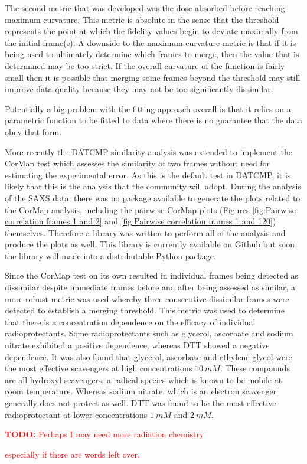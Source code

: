 The second metric that was developed was the dose absorbed before reaching maximum curvature.
This metric is absolute in the sense that the threshold represents the point at which the fidelity values begin to deviate maximally from the initial frame(s).
A downside to the maximum curvature metric is that if it is being used to ultimately determine which frames to merge, then the value that is determined may be too strict.
If the overall curvature of the function is fairly small then it is possible that merging some frames beyond the threshold may still improve data quality because they may not be too significantly dissimilar.

Potentially a big problem with the fitting approach overall is that it relies on a parametric function to be fitted to data where there is no guarantee that the data obey that form.

More recently the DATCMP similarity analysis was extended to implement the CorMap test which assesses the similarity of two frames without need for estimating the experimental error.
As this is the default test in DATCMP, it is likely that this is the analysis that the community will adopt.
During the analysis of the SAXS data, there was no package available to generate the plots related to the CorMap analysis, including the pairwise CorMap plots (Figures \ref{fig:Pairwise correlation frames 1 and 2} and \ref{fig:Pairwise correlation frames 1 and 120}) themselves.
Therefore a library was written to perform all of the analysis and produce the plots as well.
This library is currently available on Github but soon the library will made into a distributable Python package.

Since the CorMap test on its own resulted in individual frames being detected as dissimilar despite immediate frames before and after being assessed as similar, a more robust metric was used whereby three consecutive dissimilar frames were detected to establish a merging threshold.
This metric was used to determine that there is a concentration dependence on the efficacy of individual radioprotectants. Some radioprotectants such as glycerol, ascorbate and sodium nitrate exhibited a positive dependence, whereas DTT showed a negative dependence.
It was also found that glycerol, ascorbate and ethylene glycol were the most effective scavengers at high concentrations $10\ mM$.
These compounds are all hydroxyl scavengers, a radical species which is known to be mobile at room temperature.
Whereas sodium nitrate, which is an electron scavenger generally does not protect as well.
DTT was found to be the most effective radioprotectant at lower concentrations $1\ mM$ and $2\ mM$.
\textcolor{red}{
    \begin{myenumerate}
        \item \hypertarget{todo:more chemical information}{\textbf{TODO:} Perhaps I may need more radiation chemistry}
        especially if there are words left over.
    \end{myenumerate}
}

